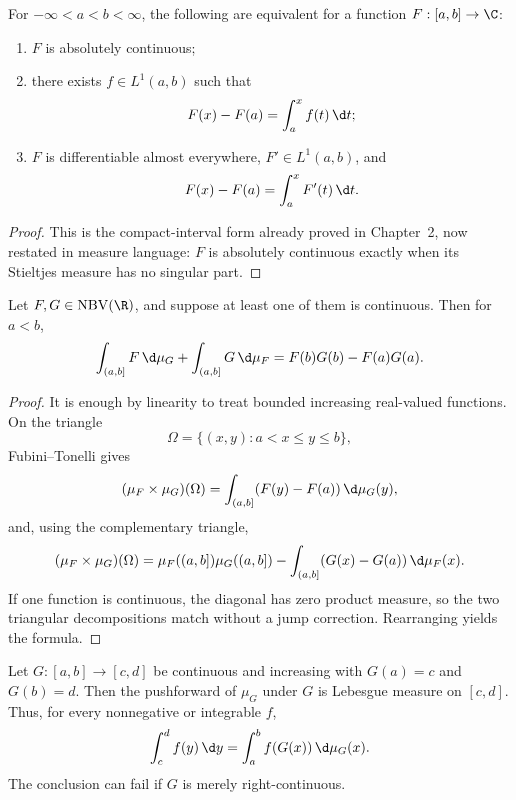 \begin{thm}
For $-\infty<a<b<\infty$, the following are equivalent for a function $F:[a,b]\to\C$:
\begin{enumerate}
  \item $F$ is absolutely continuous;
  \item there exists $f\in L^1(a,b)$ such that
  \[
  F(x)-F(a)=\int_a^xf(t)\,\d t;
  \]
  \item $F$ is differentiable almost everywhere, $F'\in L^1(a,b)$, and
  \[
  F(x)-F(a)=\int_a^xF'(t)\,\d t.
  \]
\end{enumerate}
\end{thm}

\begin{proof}
This is the compact-interval form already proved in Chapter~2, now restated in measure language: $F$ is absolutely continuous exactly when its Stieltjes measure has no singular part.
\end{proof}

\begin{thm}
Let $F,G\in\NBV(\R)$, and suppose at least one of them is continuous. Then for $a<b$,
\[
\int_{(a,b]}F\,\d\mu_G+
\int_{(a,b]}G\,\d\mu_F
=F(b)G(b)-F(a)G(a).
\]
\end{thm}

\begin{proof}
It is enough by linearity to treat bounded increasing real-valued functions. On the triangle
\[
\Omega=\{(x,y):a<x\leq y\leq b\},
\]
Fubini--Tonelli gives
\[
(\mu_F\times\mu_G)(\Omega)
 =\int_{(a,b]}(F(y)-F(a))\,\d\mu_G(y),
\]
and, using the complementary triangle,
\[
(\mu_F\times\mu_G)(\Omega)
 =\mu_F((a,b])\mu_G((a,b])-
 \int_{(a,b]}(G(x)-G(a))\,\d\mu_F(x).
\]
If one function is continuous, the diagonal has zero product measure, so the two triangular decompositions match without a jump correction. Rearranging yields the formula.
\end{proof}

\begin{thm}
Let $G:[a,b]\to[c,d]$ be continuous and increasing with $G(a)=c$ and $G(b)=d$. Then the pushforward of $\mu_G$ under $G$ is Lebesgue measure on $[c,d]$. Thus, for every nonnegative or integrable $f$,
\[
\int_c^df(y)\,\d y
=\int_a^bf(G(x))\,\d\mu_G(x).
\]
The conclusion can fail if $G$ is merely right-continuous.
\end{thm}

